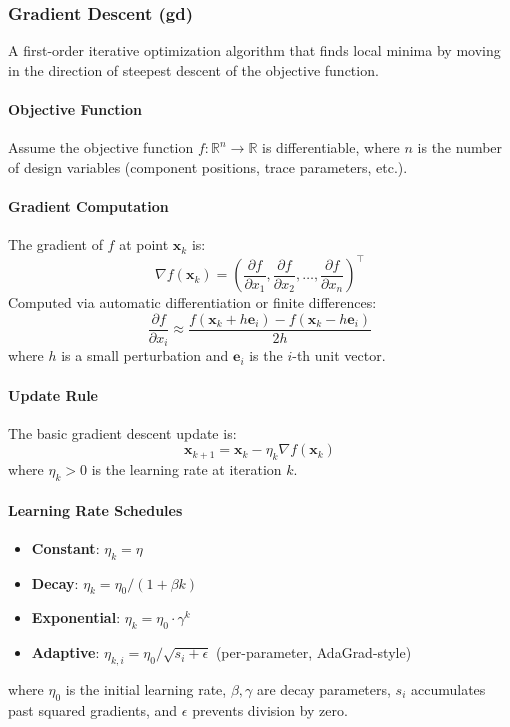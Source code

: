 \subsubsection{Gradient Descent (gd)}
A first-order iterative optimization algorithm that finds local minima by moving in the direction of steepest descent of the objective function.

\paragraph{Objective Function}
Assume the objective function $f: \mathbb{R}^n \rightarrow \mathbb{R}$ is differentiable, where $n$ is the number of design variables (component positions, trace parameters, etc.).

\paragraph{Gradient Computation}
The gradient of $f$ at point $\mathbf{x}_k$ is:
\begin{equation}
\nabla f(\mathbf{x}_k) = \left(\frac{\partial f}{\partial x_1}, \frac{\partial f}{\partial x_2}, \ldots, \frac{\partial f}{\partial x_n}\right)^{\top}
\end{equation}
Computed via automatic differentiation or finite differences:
\begin{equation}
\frac{\partial f}{\partial x_i} \approx \frac{f(\mathbf{x}_k + h\mathbf{e}_i) - f(\mathbf{x}_k - h\mathbf{e}_i)}{2h}
\end{equation}
where $h$ is a small perturbation and $\mathbf{e}_i$ is the $i$-th unit vector.

\paragraph{Update Rule}
The basic gradient descent update is:
\begin{equation}
\mathbf{x}_{k+1} = \mathbf{x}_k - \eta_k \nabla f(\mathbf{x}_k)
\end{equation}
where $\eta_k > 0$ is the learning rate at iteration $k$.

\paragraph{Learning Rate Schedules}
\begin{itemize}
\item \textbf{Constant}: $\eta_k = \eta$
\item \textbf{Decay}: $\eta_k = \eta_0 / (1 + \beta k)$
\item \textbf{Exponential}: $\eta_k = \eta_0 \cdot \gamma^k$
\item \textbf{Adaptive}: $\eta_{k,i} = \eta_0 / \sqrt{s_i + \epsilon}$ (per-parameter, AdaGrad-style)
\end{itemize}
where $\eta_0$ is the initial learning rate, $\beta, \gamma$ are decay parameters, $s_i$ accumulates past squared gradients, and $\epsilon$ prevents division by zero.

